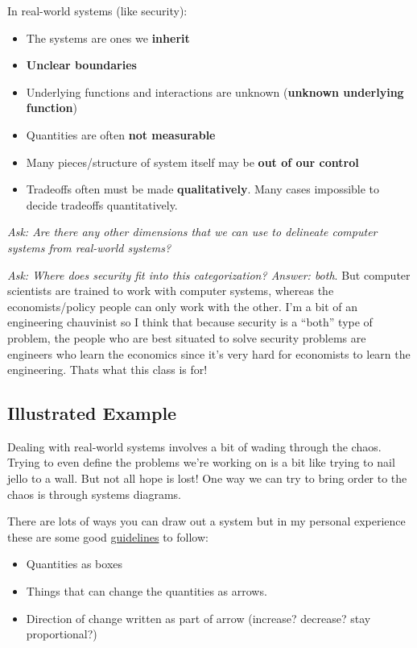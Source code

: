 \documentclass[11pt]{article}
\begin{document}
In real-world systems (like security):
\begin{itemize}
    \item The systems are ones we {\bf inherit}
    \item {\bf Unclear boundaries}
    \item Underlying functions and interactions are unknown ({\bf unknown underlying function})
    \item Quantities are often {\bf not measurable}
    \item Many pieces/structure of system itself may be {\bf out of our control}
    \item Tradeoffs often must be made {\bf qualitatively}. Many cases impossible to decide tradeoffs quantitatively.
\end{itemize}

{\it Ask: Are there any other dimensions that we can use to delineate computer systems from real-world systems?}

{\it Ask: Where does security fit into this categorization? Answer: both}. But computer scientists are trained to work with computer systems, whereas the economists/policy people can only work with the other. I'm a bit of an engineering chauvinist so I think that because security is a ``both'' type of problem, the people who are best situated to solve security problems are engineers who learn the economics since it's very hard for economists to learn the engineering. Thats what this class is for!

\subsection{Illustrated Example}

Dealing with real-world systems involves a bit of wading through the chaos. Trying to even define the problems we're working on is a bit like trying to nail jello to a wall. But not all hope is lost! One way we can try to bring order to the chaos is through systems diagrams.

There are lots of ways you can draw out a system but in my personal experience these are some good  \underline{guidelines} to follow:
\begin{itemize}
    \item Quantities as boxes
    \item Things that can change the quantities as arrows.
    \item Direction of change written as part of arrow (increase? decrease? stay proportional?)
\end{itemize}
\end{document}
